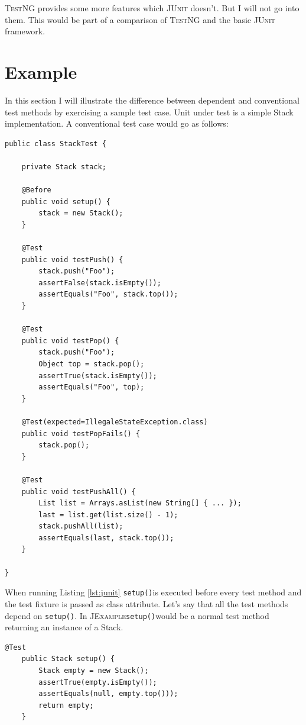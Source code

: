 \documentclass[11pt,a4paper,pdftex]{article}
\newcommand{\JUnit}{\textsc{JUnit}\xspace}
\newcommand{\JExample}{\textsc{JExample}\xspace}
\newcommand{\TestNG}{\textsc{TestNG}\xspace}
\newcommand{\ttt}[1]{\texttt{#1}}
\newcommand{\setup}{\ttt{setup()}}
\begin{document}
\TestNG provides some more features which \JUnit doesn't. But I will not go into them. This would be part of a comparison of \TestNG and the basic \JUnit framework.

\section{Example}

In this section I will illustrate the difference between dependent and conventional test methods by exercising a sample test case. Unit under test is a simple Stack implementation. A conventional test case would go as follows:

\begin{lstlisting}[label=lst:junit,caption=Conventional \JUnit test case.]
public class StackTest {

    private Stack stack;

    @Before
    public void setup() {
        stack = new Stack();
    }

    @Test
    public void testPush() {
        stack.push("Foo");
        assertFalse(stack.isEmpty());
        assertEquals("Foo", stack.top());
    }

    @Test
    public void testPop() {
        stack.push("Foo");
        Object top = stack.pop();
        assertTrue(stack.isEmpty());
        assertEquals("Foo", top);
    }

    @Test(expected=IllegaleStateException.class)
    public void testPopFails() {
        stack.pop();
    }

    @Test
    public void testPushAll() {
        List list = Arrays.asList(new String[] { ... });
        last = list.get(list.size() - 1);
        stack.pushAll(list);
        assertEquals(last, stack.top());
    }

}
\end{lstlisting}

When running Listing \ref{lst:junit} \setup is executed before every test method and the test fixture is passed as class attribute. Let's say that all the test methods depend on \setup. In \JExample \setup would be a normal test method returning an instance of a Stack.

\begin{lstlisting}[label=lst:setup,caption=Promote fixture to test with return value.]
    @Test
    public Stack setup() {
        Stack empty = new Stack();
        assertTrue(empty.isEmpty());
        assertEquals(null, empty.top()));
        return empty;
    }
\end{lstlisting}
\end{document}
